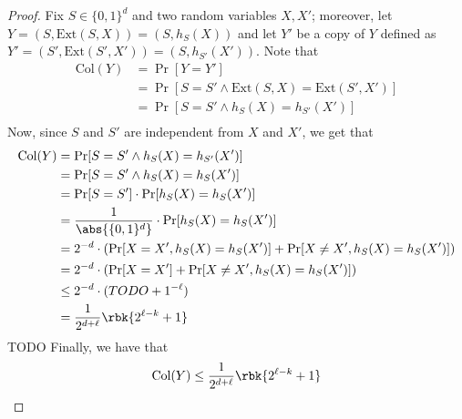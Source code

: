\documentclass[a4paper, 12pt]{report}
\begin{document}
\begin{proof}
	Fix $S \in \{0, 1\}^d$ and two random variables $X, X'$; moreover, let $Y = (S, \mbox{Ext}(S, X)) = (S, h_S(X))$ and let $Y'$ be a copy of $Y$ defined as $Y' = (S', \mbox{Ext}(S', X')) = (S, h_{S'}(X'))$. Note that
	\begin{equation*}
		\begin{split}
			\mbox{Col}(Y) & = \Pr[Y = Y']                                             \\
			              & = \Pr[S = S' \land \mbox{Ext}(S, X) = \mbox{Ext}(S', X')] \\
			              & = \Pr[S = S' \land h_S(X) = h_{S'}(X')]                   \\
		\end{split}
	\end{equation*}
	Now, since $S$ and $S'$ are independent from $X$ and $X'$, we get that
	\begin{equation*}
		\begin{split}
			\mbox{Col}(Y) & = \Pr[S = S' \land h_S(X) = h_{S'}(X')]                                           \\
			              & = \Pr[S = S' \land h_S(X) = h_S(X')]                                              \\
			              & = \Pr[S = S'] \cdot \Pr[h_S(X) = h_S(X')]                                         \\
			              & = \dfrac{1}{\abs{\{0, 1\}^d}} \cdot \Pr[h_S(X) = h_S(X')]                         \\
			              & = 2^{-d} \cdot (\Pr[X = X', h_S(X) = h_S(X')] + \Pr[X \neq X', h_S(X) = h_S(X')]) \\
			              & = 2^{-d} \cdot (\Pr[X = X'] + \Pr[X \neq X', h_S(X) = h_S(X')])                   \\
			              & \le 2^{-d} \cdot (TODO + 1^{-\ell})                                               \\
			              & = \dfrac{1}{2^{d + \ell}}\rbk{2^{\ell - k} + 1}                                   \\
		\end{split}
	\end{equation*}
	TODO 
	Finally, we have that
	\begin{equation*}
		\begin{alignedat}{2}
			\mbox{Col}(Y) & \le \dfrac{1}{2^{d + \ell}}\rbk{2^{\ell - k} + 1}                            &                                         \\

\end{alignedat}
\end{equation*}
\end{proof}
\end{document}
